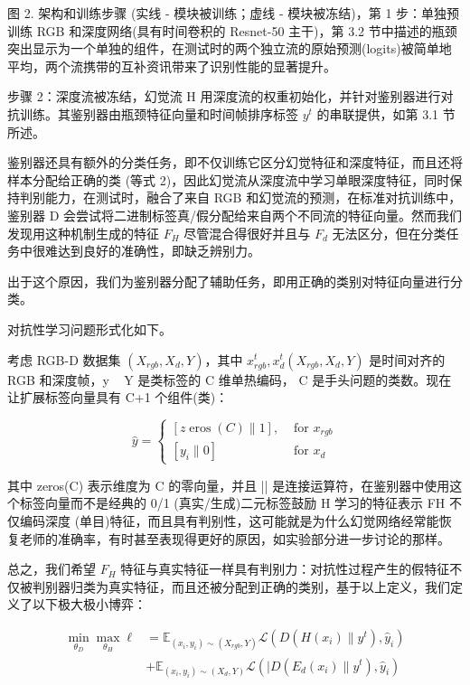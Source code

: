 图 2. 架构和训练步骤 (实线 - 模块被训练；虚线 - 模块被冻结)，第 1 步：单独预训练 RGB 和深度网络(具有时间卷积的 Resnet-50 主干)，第 3.2 节中描述的瓶颈突出显示为一个单独的组件，在测试时的两个独立流的原始预测(logits)被简单地平均，两个流携带的互补资讯带来了识别性能的显著提升。

步骤 2：深度流被冻结，幻觉流 H 用深度流的权重初始化，并针对鉴别器进行对抗训练。其鉴别器由瓶颈特征向量和时间帧排序标签 $y^{t}$ 的串联提供，如第 3.1 节所述。

鉴别器还具有额外的分类任务，即不仅训练它区分幻觉特征和深度特征，而且还将样本分配给正确的类 (等式 2)，因此幻觉流从深度流中学习单眼深度特征，同时保持判别能力，在测试时，融合了来自 RGB 和幻觉流的预测，在标准对抗训练中，鉴别器 D 会尝试将二进制标签真/假分配给来自两个不同流的特征向量。然而我们发现用这种机制生成的特征 $F_{H}$ 尽管混合得很好并且与 $F_{d}$ 无法区分，但在分类任务中很难达到良好的准确性，即缺乏辨别力。

出于这个原因，我们为鉴别器分配了辅助任务，即用正确的类别对特征向量进行分类。

对抗性学习问题形式化如下。

考虑 RGB-D 数据集 $(X_{rgb}, X_{d}, Y )$，其中 $x^{t}_{rgb}, x^{t}_{d} (X_{rgb}, X_{d}, Y)$ 是时间对齐的 RGB 和深度帧，y ~ Y 是类标签的 C 维单热编码， C 是手头问题的类数。现在让扩展标签向量具有 C+1 个组件(类)：

$$
\hat{y}= \begin{cases}{[z \operatorname{eros}(C) \| 1],} & \text { for } x_{r g b} \\ {\left[y_{i} \| 0\right]} & \text { for } x_{d}\end{cases}
$$

其中 zeros(C) 表示维度为 C 的零向量，并且 || 是连接运算符，在鉴别器中使用这个标签向量而不是经典的 0/1 (真实/生成)二元标签鼓励 H 学习的特征表示 FH 不仅编码深度 (单目)特征，而且具有判别性，这可能就是为什么幻觉网络经常能恢复老师的准确率，有时甚至表现得更好的原因，如实验部分进一步讨论的那样。

总之，我们希望 $F_{H}$ 特征与真实特征一样具有判别力：对抗性过程产生的假特征不仅被判别器归类为真实特征，而且还被分配到正确的类别，基于以上定义，我们定义了以下极大极小博弈：

$$
\begin{aligned}
\min _{\theta_{D}} \max _{\theta_{H}} \ell &=\mathbb{E}_{\left(x_{i}, y_{i}\right) \sim\left(X_{r g b}, Y\right)} \mathcal{L}\left(D\left(H\left(x_{i}\right) \| y^{t}\right), \hat{y}_{i}\right) \\
&+\mathbb{E}_{\left(x_{i}, y_{i}\right) \sim\left(X_{d}, Y\right)} \mathcal{L}\left(\mid D\left(E_{d}\left(x_{i}\right) \| y^{t}\right), \hat{y}_{i}\right)
\end{aligned}
$$

